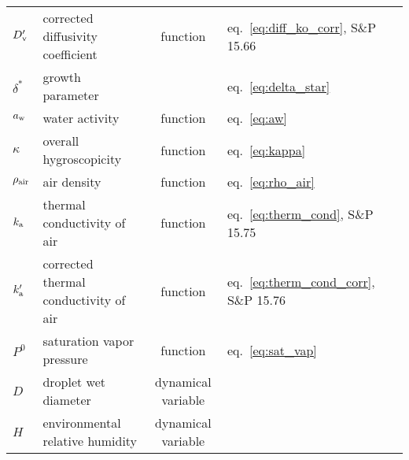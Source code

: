 \documentclass{article}
\begin{document}
\begin{tabular}{lp{4cm}clp{3cm}}
$D_{\rm v}'$     & corrected diffusivity coefficient   &  function & eq.~\ref{eq:diff_ko_corr}, S\&P 15.66  \\
$\delta^*$  & growth parameter &  & eq.~\ref{eq:delta_star}\\
$a_{\rm w}$  & water activity  & function & eq.~\ref{eq:aw}   \\
$\kappa$      &  overall hygroscopicity   &  function &  eq.~\ref{eq:kappa}  \\
$ \rho_{\rm air}$    &  air density   &  function &  eq.~\ref{eq:rho_air}  \\
$k_{\rm a} $     & thermal conductivity of air    &  function&  eq.~\ref{eq:therm_cond}, S\&P 15.75   \\
$k_{\rm a}' $    & corrected thermal conductivity of air    &  function &  eq.~\ref{eq:therm_cond_corr}, S\&P 15.76   \\
$P^0$   & saturation vapor pressure &  function & eq.~\ref{eq:sat_vap}  \\
$D$     &  droplet wet diameter  & dynamical variable  &     \\
$H$     &  environmental relative humidity  &  dynamical variable &  \\

\hline 
\end{tabular}
\end{document}
